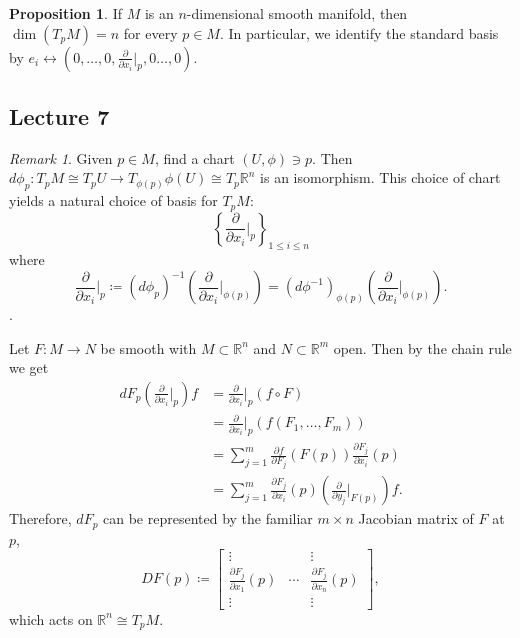 \documentclass[10pt,letterpaper,cm]{nupset}
\theoremstyle{definition}
\theoremstyle{theorem}
\newtheorem{prop}[definition]{Proposition}
\theoremstyle{remark}
\newtheorem{remark}[definition]{Remark}
\newcommand{\R}{\mathbb R}
\newcommand{\1}{\mathbf{1}}
\newcommand{\0}{\vec 0}
\begin{document}
\begin{prop}
If $M$ is an $n$-dimensional smooth manifold, then $\dim(T_pM) =n$ for every $p\in M$. In particular, we identify the standard basis by $e_i \leftrightarrow \left(0, \ldots, 0, \frac{\partial}{\partial{x_i}}\bigr\rvert_p, 0 \ldots, 0\right)$.
\end{prop}

\subsection{Lecture 7}

\begin{remark}\label{basis}
Given $p\in M$, find a chart $(U, \phi)\ni p$. Then $d\phi_p : T_pM \cong T_pU\to T_{\phi(p)}\phi(U) \cong T_p \R^n$ is an isomorphism. This choice of chart yields a natural choice of basis for $T_pM$: $$\left\{\frac{\partial}{\partial{x_i}}\bigr\rvert_{p} \right\}_{1\leq i \leq n}$$ where $$\frac{\partial}{\partial{x_i}}\bigr\rvert_{p}\coloneqq  (d\phi_p)^{-1}\left(\frac{\partial}{\partial{x_i}}\bigr\rvert_{\phi(p)}\right) = (d\phi^{-1})_{\phi(p)}\left(\frac{\partial}{\partial{x_i}}\bigr\rvert_{\phi(p)}\right).$$.
\end{remark}

Let $F: M \to N$ be smooth with $M\subset \R^n$ and $N \subset \R^m$ open. Then by the chain rule we get 
\begin{align*}
dF_p\left(\frac{\partial}{\partial{x_i}}\bigr\rvert_{p}\right)f & = \frac{\partial}{\partial{x_i}}\bigr\rvert_{p}(f \circ F) 
\\ & = \frac{\partial}{\partial{x_i}}\bigr\rvert_{p}(f(F_1, \ldots, F_m)) 
\\ & =\sum_{j=1}^m  \frac{\partial{f}}{\partial{F_j}}(F(p))\frac{\partial{F_j}}{\partial{x_i}}(p)
\\ & = \sum_{j=1}^m \frac{\partial{F_j}}{\partial{x_i}}(p) \left(\frac{\partial}{\partial{y_j}}\bigr\rvert_{F(p)}\right)f.
\end{align*} Therefore, $dF_p$ can be represented by the familiar $m\times n$ Jacobian matrix of $F$ at $p$, 
 $$DF(p) \coloneqq  \begin{bmatrix}  \vdots & & \vdots \\ \frac{\partial{F_j}}{\partial{x_1}}(p)  & \cdots & \frac{\partial{F_j}}{\partial{x_n}}(p)  \\ \vdots & & \vdots  
\end{bmatrix},$$ which acts on $\R^n \cong T_pM$.
\end{document}
